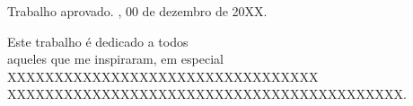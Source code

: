 \documentclass[
	12pt,				%
	openright,			%
	oneside,			%
	a4paper,			%
	english,			%
	french,				%
	spanish,			%
	brazil,				%
	]{abntex2}
\begin{document}
%
% 
%
\begin{folhadeaprovacao}

  \begin{center}
    {\ABNTEXchapterfont\large\imprimirautor}

    \vspace*{\fill}\vspace*{\fill}
    {\ABNTEXchapterfont\bfseries\Large\imprimirtitulo}
    \vspace*{\fill}
    
    \hspace{.45\textwidth}
    \begin{minipage}{.5\textwidth}
        \imprimirpreambulo
    \end{minipage}%
    \vspace*{\fill}
   \end{center}
    
   Trabalho aprovado. \imprimirlocal, 00 de dezembro de 20XX.

      
   \begin{center}
    \vspace*{0.5cm}
    {\large\imprimirlocal}
    \par
    {\large\imprimirdata}
    \vspace*{1cm}
  \end{center}
  
\end{folhadeaprovacao}


\begin{dedicatoria}
   \vspace*{\fill}
	\begin{flushright}
        Este trabalho é dedicado a todos\\ 
       aqueles que me inspiraram, em especial\\ 
       XXXXXXXXXXXXXXXXXXXXXXXXXXXXXXXXX \\
       XXXXXXXXXXXXXXXXXXXXXXXXXXXXXXXXXXXXXXXXXX.
    \end{flushright}
\end{dedicatoria}
\end{document}
